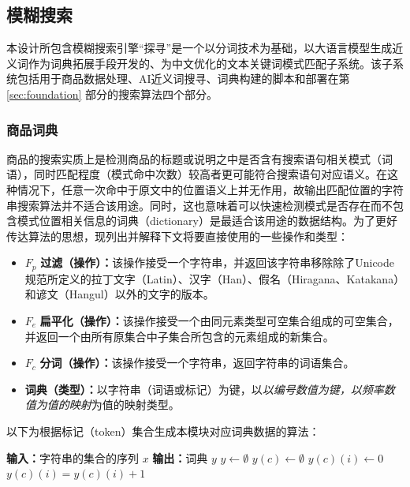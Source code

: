 \subsection{模糊搜索}

本设计所包含模糊搜索引擎“探寻”是一个以分词技术为基础，以大语言模型生成近义词作为词典拓展手段开发的、为中文优化的文本关键词模式匹配子系统。该子系统包括用于商品数据处理、AI近义词搜寻、词典构建的脚本和部署在第 \ref{sec:foundation} 部分的搜索算法四个部分。

\subsubsection{商品词典}

商品的搜索实质上是检测商品的标题或说明之中是否含有搜索语句相关模式（词语），同时匹配程度（模式命中次数）较高者更可能符合搜索语句对应语义。在这种情况下，任意一次命中于原文中的位置语义上并无作用，故输出匹配位置的字符串搜索算法并不适合该用途。同时，这也意味着可以快速检测模式是否存在而不包含模式位置相关信息的词典（dictionary）是最适合该用途的数据结构。为了更好传达算法的思想，现列出并解释下文将要直接使用的一些操作和类型：

\begin{itemize}
	\item $F_p$ \textbf{过滤（操作）：}该操作接受一个字符串，并返回该字符串移除除了Unicode规范\cite{unicode16.0}所定义的拉丁文字（Latin）、汉字（Han）、假名（Hiragana、Katakana）和谚文（Hangul）以外的文字的版本。
	\item $F_e$ \textbf{扁平化（操作）：}该操作接受一个由同元素类型可空集合组成的可空集合，并返回一个由所有原集合中子集合所包含的元素组成的新集合。
	\item $F_c$ \textbf{分词（操作）：}该操作接受一个字符串，返回字符串的词语集合。
	\item \textbf{词典（类型）：}以字符串（词语或标记）为键，以\textit{以编号数值为键，以频率数值为值的映射}为值的映射类型。
\end{itemize}

以下为根据标记（token）集合生成本模块对应词典数据的算法：

\vspace{1em}
\begin{algorithmic}[1]
	\STATE \textbf{输入：}字符串的集合的序列 $x$
	\STATE \textbf{输出：}词典 $y$
	\STATE $y \gets \emptyset$
				\STATE $y(c) \gets \emptyset$
			\ENDIF
				\STATE $y(c)(i) \gets 0$
			\ENDIF
			\STATE $y(c)(i) = y(c)(i) + 1$
		\ENDFOR
	\ENDFOR
\end{algorithmic}
\vspace{1em}

